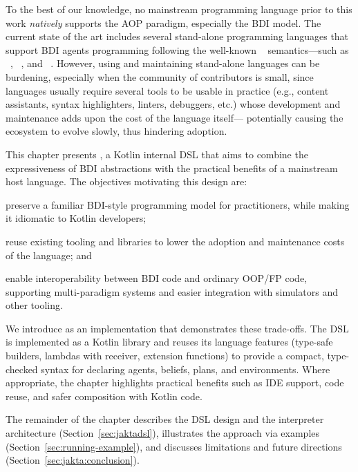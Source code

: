 To the best of our knowledge,
no mainstream programming language prior to this work 
\emph{natively} supports the \ac{AOP} paradigm,
especially the \ac{BDI} model.
%
The current state of the art includes several stand-alone programming languages
that support \ac{BDI} agents programming following the well-known
\agentspeak{}~\cite{rao1991bdi} semantics---such as
\jason~\cite{BordiniHW2007}, \astra~\cite{CollierRL15}, and \goal~\cite{Hindriks2009}.
%
However,
using and maintaining stand-alone languages can be burdening,
especially when the community of contributors is small, since
languages usually require several tools to be usable in practice
(e.g., content assistants, syntax highlighters, linters, debuggers, etc.)
whose development and maintenance adds upon the cost of the language itself---%
potentially causing the ecosystem to evolve slowly,
thus hindering adoption.

This chapter presents \jakta{}, 
a Kotlin internal \ac{DSL} that aims to combine the expressiveness of \ac{BDI} abstractions 
with the practical benefits of a mainstream host language. 
%
The objectives motivating this design are:
\begin{inlinelist}
    \item preserve a familiar \ac{BDI}-style programming model for practitioners, 
    while making it idiomatic to Kotlin developers;
    \item reuse existing tooling and libraries to lower the adoption and maintenance costs of the language; and
    \item enable interoperability between \ac{BDI} code and ordinary \ac{OOP}/\ac{FP} code, 
    supporting multi-paradigm systems and easier integration with simulators and other tooling.
\end{inlinelist}

We introduce \jakta{} as an implementation that demonstrates these trade-offs. 
%
The \ac{DSL} is implemented as a Kotlin library and reuses its language features
(type-safe builders, lambdas with receiver, extension functions) 
to provide a compact, 
type-checked syntax for declaring 
agents, 
beliefs, 
plans, 
and environments.
% 
Where appropriate, 
the chapter highlights practical benefits such as \ac{IDE} support, 
code reuse, and safer composition with Kotlin code.

The remainder of the chapter describes the \ac{DSL} design and the interpreter architecture (Section~\ref{sec:jaktadsl}), illustrates the approach via examples (Section~\ref{sec:running-example}), and discusses limitations and future directions (Section~\ref{sec:jakta:conclusion}).

